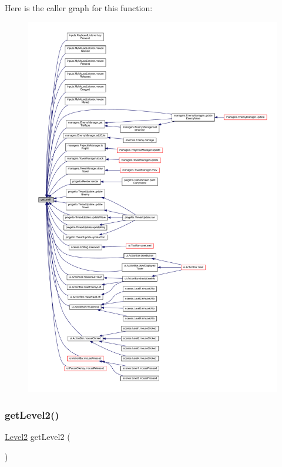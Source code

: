 Here is the caller graph for this function\+:
\nopagebreak
\begin{figure}[H]
\begin{center}
\leavevmode
\includegraphics[width=350pt]{classprogetto_1_1_game_a6991f76e58df8f4b9bc8e94e3389d150_icgraph}
\end{center}
\end{figure}
\mbox{\label{classprogetto_1_1_game_a26827f97d382e852c53c15990619c8b7}} 
\subsubsection{\texorpdfstring{get\+Level2()}{getLevel2()}}
{\footnotesize\ttfamily \hyperlink{classscenes_1_1_level2}{Level2} get\+Level2 (\begin{DoxyParamCaption}{ }\end{DoxyParamCaption})}



